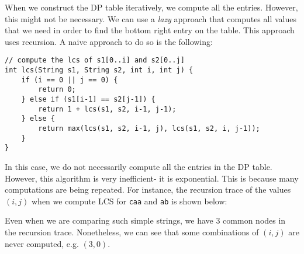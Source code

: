 \documentclass[a4paper, openany]{memoir}
\begin{document}
    When we construct the DP table iteratively, we compute all the entries. However, this might not be necessary. We can use a \emph{lazy} approach that computes all values that we need in order to find the bottom right entry on the table. This approach uses recursion. A naive approach to do so is the following:
\begin{lstlisting}[language=pseudocode]
// compute the lcs of s1[0..i] and s2[0..j]
int lcs(String s1, String s2, int i, int j) {
    if (i == 0 || j == 0) {
        return 0;
    } else if (s1[i-1] == s2[j-1]) {
        return 1 + lcs(s1, s2, i-1, j-1);
    } else {
        return max(lcs(s1, s2, i-1, j), lcs(s1, s2, i, j-1));
    }
}
\end{lstlisting}
    In this case, we do not necessarily compute all the entries in the DP table. However, this algorithm is very inefficient- it is exponential. This is because many computations are being repeated. For instance, the recursion trace of the values $(i, j)$ when we compute LCS for \texttt{caa} and \texttt{ab} is shown below:
    \begin{figure}[H]
        \centering
    \end{figure}
    \noindent Even when we are comparing such simple strings, we have 3 common nodes in the recursion trace. Nonetheless, we can see that some combinations of $(i, j)$ are never computed, e.g. $(3, 0)$. 
\end{document}
